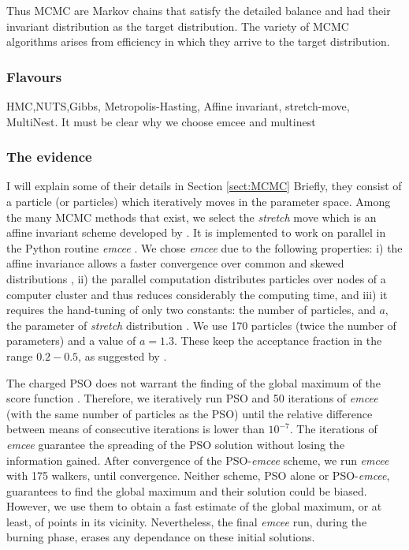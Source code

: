 Thus MCMC are Markov chains that satisfy the detailed balance and had their invariant distribution as the target distribution. 
The variety of MCMC algorithms arises from efficiency in which they arrive to the target distribution.
   
\subsubsection{Flavours}
HMC,NUTS,Gibbs, Metropolis-Hasting, Affine invariant, stretch-move, MultiNest.
It must be clear why we choose emcee and multinest
\subsubsection{The evidence}
 I will explain some of their details in Section \ref{sect:MCMC} Briefly, they consist of a particle (or particles) which iteratively moves in the parameter space. Among the many MCMC methods that exist, we select the \emph{stretch} move which is an affine invariant scheme developed by \citet{Goodman2010}. It is implemented to work on parallel in the Python routine \emph{emcee} \citep{Foreman2013}. We chose \emph{emcee} due to the following properties: i) the affine invariance allows a faster convergence over common and skewed distributions \cite[see][for detail]{Goodman2010,Foreman2013}, ii) the parallel computation distributes particles over nodes of a computer cluster and thus reduces considerably the computing time, and iii) it requires the hand-tuning of only two constants: the number of particles, and $a$, the parameter of \emph{stretch} distribution \cite[see Eq. 9 of ][]{Goodman2010}. We use 170 particles (twice the number of parameters) and a value of $a=1.3$. These keep the acceptance fraction in the range $0.2 - 0.5$, as suggested by \citet{Foreman2013}.
 
 
 The charged PSO does not warrant the finding of the global maximum of the score function \cite[see][and references therein]{Blackwell2002}. Therefore, we iteratively run PSO and 50 iterations of \emph{emcee} (with the same number of particles as the PSO) until the relative difference between means of consecutive iterations is lower than $10^{-7}$. The iterations of \emph{emcee} guarantee the spreading of the PSO solution without losing the information gained. After convergence of the PSO-\emph{emcee} scheme, we run \emph{emcee} with 175 walkers, until convergence. Neither scheme, PSO alone or PSO-\emph{emcee}, guarantees to find the global maximum and their solution could be biased. However, we use them to obtain a fast estimate of the global maximum, or at least, of points in its vicinity. Nevertheless, the final \emph{emcee} run, during the burning phase, erases any dependance on these initial solutions.
 
